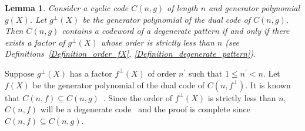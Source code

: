 \documentclass[10pt,journal]{IEEEtran}
\newtheorem{lemma}{Lemma}
\begin{document}
\begin{lemma}
\label{Lemma_dual_gen_factor_degenerate_pattern}
%  
Consider a cyclic code $C(n,g)$ of length $n$ and generator polynomial $g(X)$.
Let $g^{\perp}(X)$ be the generator polynomial of the dual code of $C(n,g)$.
Then $C(n,g)$ contains a codeword of a degenerate pattern if and only if there exists a 
factor of $g^{\perp}(X)$ whose order is strictly less than $n$ (see Definitions~\ref{Definition_order_fX}, \ref{Definition_degenerate_pattern}).
% 
\end{lemma}
% 
\begin{IEEEproof}
%  
% 
Suppose $g^{\perp}(X)$ has a factor $f^{\perp}(X)$ of order $n^{\prime}$ such that $1 \leq n^{\prime} < n$.
Let $f(X)$ be the generator polynomial of the dual code of $C(n,f^{\perp})$.
It is known that $C(n,f) \subseteq C(n,g)$~\cite[Sec.~7.4]{Peterson_1996}.  
Since the order of $f^{\perp}(X)$ is strictly less than $n$, $C(n,f)$ will be 
a degenerate code~\cite[Sec.~8.3]{Macwilliams_Sloane_1977} and the proof is complete since $C(n,f) \subseteq C(n,g)$. 


\end{IEEEproof}
\end{document}
